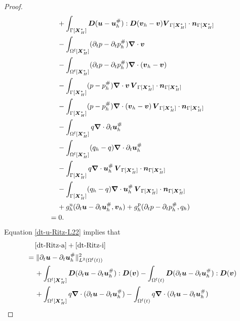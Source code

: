 \documentclass[11pt,reqno]{amsart}
\theoremstyle{definition}
\theoremstyle{plain}
\numberwithin{theorem}{section}
\numberwithin{proposition}{section}
\numberwithin{lemma}{section}
\numberwithin{equation}{section}
\newcommand{\bs}[1]{\boldsymbol{#1}}
\newcommand{\uu}[1]  {{\bs{#1}} }
\newcommand{\grad}   { \uu{\nabla}    }
\newcommand{\bv}{{\bs v}}
\renewcommand{\(}{\bigl(}
\renewcommand{\)}{\bigr)}
\begin{document}
\begin{proof}
\begin{subequations}
\begin{align}
&\quad\, 
+ \int_{\Gamma[\bs X_H^*]} {\bs D}({\bs u}-{\bs u}_h^\#): {\bs D}({\bs v}_h-{\bs v}) {\bs V}_{\Gamma[\bs X_H^*]}\cdot{\bs n}_{\Gamma[\bs X_H^*]} \label{dt-Ritz-d}\\
&\quad\, 
- \int_{\Omega^{\rm f}[\bs X_H^*]} ( \partial_tp - \partial_tp_h^\# ) \grad\cdot{\bs v} \label{dt-Ritz-e}\\
&\quad\, 
- \int_{\Omega^{\rm f}[\bs X_H^*]} ( \partial_tp - \partial_tp_h^\# ) \grad\cdot({\bs v}_h-{\bs v}) \label{dt-Ritz-f}\\
&\quad\, 
- \int_{\Gamma[\bs X_H^*]} ( p - p_h^\# ) \grad\cdot{\bs v}\, {\bs V}_{\Gamma[\bs X_H^*]}\cdot{\bs n}_{\Gamma[\bs X_H^*]} \label{dt-Ritz-g}\\ 
&\quad\, 
- \int_{\Gamma[\bs X_H^*]} ( p - p_h^\# ) \grad\cdot({\bs v}_h-{\bs v})\, {\bs V}_{\Gamma[\bs X_H^*]}\cdot{\bs n}_{\Gamma[\bs X_H^*]} \label{dt-Ritz-h}\\
&\quad\, 
- \int_{\Omega^{\rm f}[\bs X_H^*]}  q \grad\cdot \partial_t{\bs u}_h^\# \label{dt-Ritz-i}\\
&\quad\, 
- \int_{\Omega^{\rm f}[\bs X_H^*]}  (q_h-q) \grad\cdot \partial_t{\bs u}_h^\# \label{dt-Ritz-j}\\
&\quad\, 
- \int_{\Gamma[\bs X_H^*]} q \grad\cdot{\bs u}_h^\# \, {\bs V}_{\Gamma[\bs X_H^*]}\cdot{\bs n}_{\Gamma[\bs X_H^*]} \label{dt-Ritz-k}\\
&\quad\, 
- \int_{\Gamma[\bs X_H^*]} (q_h-q) \grad\cdot {\bs u}_h^\# \, {\bs V}_{\Gamma[\bs X_H^*]}\cdot{\bs n}_{\Gamma[\bs X_H^*]} \label{dt-Ritz-l}\\
&\quad\, + g_h^{\rm u} (\partial_t{\bs u}-\partial_t{\bs u}_h^\#,\bv_h ) + g_h^{\rm p} (\partial_tp - \partial_tp_h^\#,q_h ) \label{dt-Ritz-m} \\
&= 0 . \notag
\end{align}
\end{subequations}
Equation \eqref{dt-u-Ritz-L22} implies that 
\begin{subequations}
\begin{align}
&\quad\,\eqref{dt-Ritz-a} + \eqref{dt-Ritz-i} \notag\\
&= \|\partial_t{\bs u}-\partial_t{\bs u}_h^\#\|_{L^2(\Omega^{\rm f}(t))}^2 \label{dt-Ritz-a-i-a}\\
&\quad\, + \int_{\Omega^{\rm f}[\bs X_H^*]} {\bs D}(\partial_t{\bs u}-\partial_t{\bs u}_h^\#): {\bs D}({\bs v}) - \int_{\Omega^{\rm f}(t)} {\bs D}(\partial_t{\bs u}-\partial_t{\bs u}_h^\#): {\bs D}({\bs v}) \label{dt-Ritz-a-i-b}\\
&\quad\, + \int_{\Omega^{\rm f}[\bs X_H^*]}  q \grad\cdot(\partial_t{\bs u}-\partial_t{\bs u}_h^\#) - \int_{\Omega^{\rm f}(t)}  q \grad\cdot(\partial_t{\bs u}-\partial_t{\bs u}_h^\#) \label{dt-Ritz-a-i-c}\\

\end{align}
\end{subequations}
\end{proof}
\end{document}
